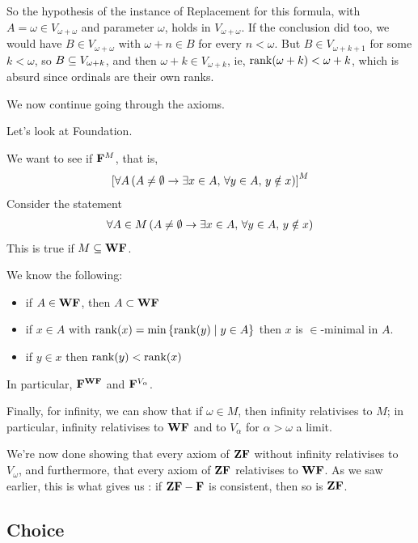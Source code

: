 \begin{boxnexample}
    So the hypothesis of the instance of Replacement for this formula, with $A = \omega \in V_{\omega + \omega}$ and parameter $\omega$, holds in $V_{\omega + \omega}$. If the conclusion did too, we would have $B \in V_{\omega + \omega}$ with $\omega + n \in B$ for every $n < \omega$. But $B \in V_{\omega + k + 1}$ for some $k < \omega$, so $B \subseteq V_{\omega + k}$, and then $\omega + k \in V_{\omega + k}$, ie, $\operatorname{rank}\!\left( \omega + k \right) < \omega + k$, which is absurd since ordinals are their own ranks.
\end{boxnexample}

We now continue going through the axioms.

Let's look at Foundation.

We want to see if $\mathbf{F}^M$, that is,
\begin{align*}
    \left[ \forall A \left( A \ne \emptyset \to \exists x \in A, \, \forall y \in A, \, y \notin x \right) \right]^M
\end{align*}
Consider the statement
\begin{align*}
    \forall A \in M \left( A \ne \emptyset \to \exists x \in A, \, \forall y \in A, \, y \notin x \right)
\end{align*}
This is true if $M \subseteq \mathbf{WF}$.

We know the following:
\begin{itemize}
    \item if $A \in \mathbf{WF}$, then $A \subset \mathbf{WF}$
    \item if $x \in A$ with $\operatorname{rank}\!\left( x \right) = \min\left\{ \operatorname{rank}\!\left( y \right) \; \middle\vert \; y \in A \right\}$ then $x$ is $\in$-minimal in $A$.
    \item if $y \in x$ then $\operatorname{rank}\!\left( y \right) < \operatorname{rank}\!\left( x \right)$
\end{itemize}
In particular, $\mathbf{F}^{\mathbf{WF}}$ and $\mathbf{F}^{V_{\alpha}}$.

Finally, for infinity, we can show that if $\omega \in M$, then infinity relativises to $M$; in particular, infinity relativises to $\mathbf{WF}$ and to $V_{\alpha}$ for $\alpha > \omega$ a limit.

We're now done showing that every axiom of $\mathbf{ZF}$ without infinity relativises to $V_{\omega}$, and furthermore, that every axiom of $\mathbf{ZF}$ relativises to $\mathbf{WF}$. As we saw earlier, this is what gives us : if $\mathbf{ZF} - \mathbf{F}$ is consistent, then so is $\mathbf{ZF}$.

\subsection{Choice}


